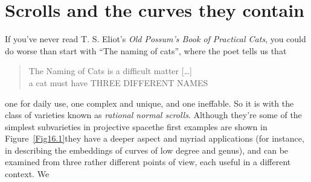 


\chapter{Scrolls and the curves they contain}
\label{ScrollsChapter}

If you've never read T. S. Eliot's {\it Old Possum's Book of Practical Cats}, 
you could do worse than start with ``The naming of cats'',
where the poet tells us that
\begin{quote}%
The Naming of Cats is a difficult matter [\dots]\\
a cat must have THREE DIFFERENT NAMES
\end{quote}%

\noindent %
\emdash one for daily use, one complex and unique, and one ineffable.
So it is with the class of varieties
%
%
%
known as \emph{rational normal scrolls}. Although they're some of the
%
%
simplest subvarieties in projective space\emdash the first examples
are shown in Figure~\ref{Fig16.1}\emdash they have a deeper aspect and
myriad applications (for instance, in describing the embeddings of
curves of low degree and genus), and can be examined from three rather
different points of view, each useful in a different context. We
%
